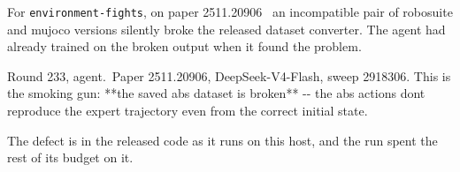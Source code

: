 For \texttt{environment-fights}, on paper 2511.20906~\citep{chun2025dasip} an incompatible pair of
robosuite and mujoco versions silently broke the released dataset converter.
The agent had already trained on the broken output when it found the problem.

\begin{agentturn}{Round 233, agent.\ Paper 2511.20906, DeepSeek-V4-Flash, sweep 2918306.}
This is the smoking gun: **the saved abs dataset is broken** -{}- the abs actions don\textquotesingle t reproduce the expert trajectory even from the correct initial state.
\end{agentturn}

The defect is in the released code as it runs on this host, and the run
spent the rest of its budget on it.

\FloatBarrier  %
